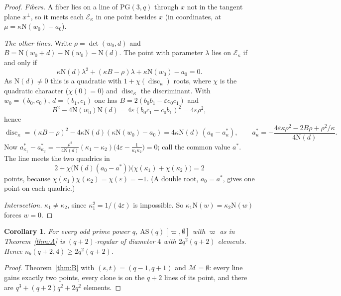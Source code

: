 \documentclass[11pt]{amsart}
\newtheorem{corollary}[theorem]{Corollary}
\theoremstyle{definition}
\theoremstyle{remark}
\newcommand{\cE}{\mathcal{E}}
\newcommand{\cM}{\mathcal{M}}
\newcommand{\PG}{\mathrm{PG}}
\newcommand{\AS}{\mathrm{AS}}
\newcommand{\Nm}{\mathrm{N}}
\begin{document}
\begin{proof}
\emph{Fibers.} A fiber lies on a line of $\PG(3,q)$ through $x$ not in the tangent plane $x^\perp$, so it meets each $\cE_\kappa$ in one point besides $x$ (in coordinates, at $\mu=\kappa\Nm(w_0)-a_0$).

\emph{The other lines.} Write $\rho=\det(w_0,d)$ and $B=\Nm(w_0+d)-\Nm(w_0)-\Nm(d)$. The point with parameter $\lambda$ lies on $\cE_\kappa$ if and only if
\[
\kappa\Nm(d)\lambda^2+(\kappa B-\rho)\lambda+\kappa\Nm(w_0)-a_0=0 .
\]
As $\Nm(d)\ne0$ this is a quadratic with $1+\chi(\operatorname{disc}_\kappa)$ roots, where $\chi$ is the quadratic character ($\chi(0)=0$) and $\operatorname{disc}_\kappa$ the discriminant. With $w_0=(b_0,c_0)$, $d=(b_1,c_1)$ one has $B=2(b_0b_1-\varepsilon c_0c_1)$ and
\[
B^2-4\Nm(w_0)\Nm(d)=4\varepsilon(b_0c_1-c_0b_1)^2=4\varepsilon\rho^2,
\]
hence
\[
\operatorname{disc}_\kappa=(\kappa B-\rho)^2-4\kappa\Nm(d)(\kappa\Nm(w_0)-a_0)=4\kappa\Nm(d)\,(a_0-a^*_\kappa),\qquad a^*_\kappa=-\frac{4\varepsilon\kappa\rho^2-2B\rho+\rho^2/\kappa}{4\Nm(d)}.
\]
Now $a^*_{\kappa_1}-a^*_{\kappa_2}=-\frac{\rho^2}{4\Nm(d)}(\kappa_1-\kappa_2)\bigl(4\varepsilon-\frac1{\kappa_1\kappa_2}\bigr)=0$; call the common value $a^*$. The line meets the two quadrics in
\[
2+\chi\bigl(\Nm(d)(a_0-a^*)\bigr)\bigl(\chi(\kappa_1)+\chi(\kappa_2)\bigr)=2
\]
points, because $\chi(\kappa_1)\chi(\kappa_2)=\chi(\varepsilon)=-1$. (A double root, $a_0=a^*$, gives one point on each quadric.)

\emph{Intersection.} $\kappa_1\ne\kappa_2$, since $\kappa_1^2=1/(4\varepsilon)$ is impossible. So $\kappa_1\Nm(w)=\kappa_2\Nm(w)$ forces $w=0$.
\end{proof}

\begin{corollary}\label{cor:A1}
For every odd prime power $q$, $\AS(q)[\varpi,\emptyset]$ with $\varpi$ as in Theorem~\ref{thm:A} is $(q+2)$-regular of diameter $4$ with $2q^2(q+2)$ elements. Hence $n_b(q+2,4)\ge2q^2(q+2)$.
\end{corollary}

\begin{proof}
Theorem~\ref{thm:B} with $(s,t)=(q-1,q+1)$ and $\cM=\emptyset$: every line gains exactly two points, every clone is on the $q+2$ lines of its point, and there are $q^3+(q+2)q^2+2q^2$ elements.
\end{proof}
\end{document}
